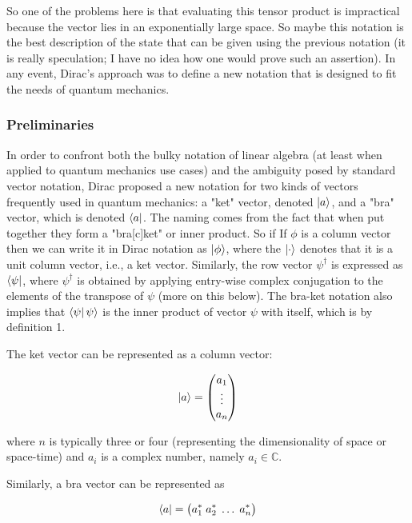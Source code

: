 \documentclass[11pt, oneside]{article}   	%
\begin{document}
\bigskip
\noindent
So one of the problems here is that evaluating this tensor product is impractical because the vector lies in an exponentially large space. So maybe this notation is the best description 
of the state that can be given using the previous notation (it is really speculation; I have no idea how one would prove such an assertion). In any event, Dirac's approach was to 
define a new notation that is designed to fit the needs of quantum mechanics. 

\subsubsection{Preliminaries}
In order to confront both the bulky notation of linear algebra (at least when applied to quantum mechanics use cases) and the ambiguity posed by standard vector notation, 
Dirac proposed a new notation for two kinds of vectors frequently used in quantum mechanics:  a "ket" vector, denoted 
$\ket{a}$, and a "bra" vector, which is denoted $\bra{a}$. The naming comes from the fact that when put together they form a "bra[c]ket" or inner product.  So if If $\phi$ is a column vector 
then we can write it in Dirac notation as $\ket{\phi}$, where the $\ket{\cdot}$ denotes that it is a unit column vector, i.e., a ket vector. Similarly, the row vector 
$\psi^\dagger$  is expressed as $\bra{\psi}$, where $\psi^\dagger$  is obtained by applying entry-wise complex conjugation to the elements of the transpose of $\psi$ (more on this below). 
The bra-ket notation also implies that $\bra{\psi} \psi \rangle$  is the inner product of vector $\psi$ with itself, which is by definition 1.

\bigskip
\noindent
The ket vector can be represented as a column vector:

\begin{equation*}
\ket{a} = 
\begin{pmatrix}
a_1\\
\vdots \\
a_n
\end{pmatrix}
\end{equation*}

\noindent
where $n$ is typically three or four (representing the dimensionality of space or space-time) and $a_i$ is a complex number, namely $a_i \in \mathbb{C}$.

\bigskip
\noindent
Similarly, a bra vector can be represented as


\begin{equation*}
\bra{a} = \big (a^*_1 \; a^*_2 \; \hdots \; a^*_n \big )
\end{equation*}
\end{document}
